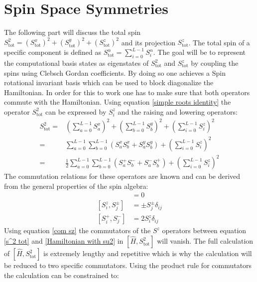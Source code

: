 \documentclass{scrartcl}
\begin{document}
\section{Spin Space Symmetries}
The following part will discuss the total spin $S^2_{\mathrm{tot}}=(S^x_{\mathrm{tot}})^2+(S^y_{\mathrm{tot}})^2+(S^z_{\mathrm{tot}})^2$ and its projection $S^z_{\mathrm{tot}}$. The total spin of a specific component is defined as $S^{\alpha}_{\mathrm{tot}}=\sum ^{L-1}_{i=0} S_i^{\alpha}$. The goal will be to represent the computational basis states as eigenstates of $S^2_{\mathrm{tot}}$ and $S^z_{\mathrm{tot}}$ by coupling the spins using Clebsch Gordan coefficients. By doing so one achieves a Spin rotational invariant basis which can be used to block diagonalize the Hamiltonian. In order for this to work one has to make sure that both operators commute with the Hamiltonian. Using equation \ref{simple roots identity} the operator $S^2_{\mathrm{tot}}$ can be expressed by $S^z_{i}$ and the raising and lowering operators:
\begin{equation}\begin{aligned}
    S^2_{\mathrm{tot}}=& \left( \sum ^{L-1}_{a=0} S_a^{x} \right)^2+\left( \sum ^{L-1}_{b=0} S_b^{y} \right)^2+\left( \sum ^{L-1}_{i=0} S_i^{z} \right)^2 \\
    =& \sum ^{L-1}_{a=0} \sum ^{L-1}_{b=0} \left( S_a^{x} S_b^{x} + S_a^{y} S_b^{y} \right) +\left( \sum ^{L-1}_{i=0} S_i^{z} \right)^2\\
    =& \frac{1}{2} \sum ^{L-1}_{a=0} \sum ^{L-1}_{b=0} \left(S^{+}_a S^{-}_b + S^{-}_a S^{+}_b \right)  +\left( \sum ^{L-1}_{i=0} S_i^{z} \right)^2
    \label{s^2 tot}
\end{aligned}\end{equation}
The commutation relations for these operators are known and can be derived from the general properties of the spin algebra: 
\begin{align}
    [S^z_i,S^z_j]&=0 \label{com sz} \\ [S^z_i,S^{\pm}_j]&=\pm S^{\pm}_j \label{com sz s+}\delta_{ij} \\ [S^{+}_i,S^{-}_j]&=2 S^z_i \delta_{ij} \label{com s+ s-}
\end{align}
Using equation \ref{com sz} the commutators of the $S^z$ operators between equation \ref{s^2 tot} and \ref{Hamiltonian with su2} in $[\hat{H},S^2_{\mathrm{tot}}]$ will vanish. The full calculation of $[\hat{H},S^2_{\mathrm{tot}}]$ is extremely lengthy and repetitive which is why the calculation will be reduced to two specific commutators. Using the product rule for commutators the calculation can be constrained to:
\end{document}

